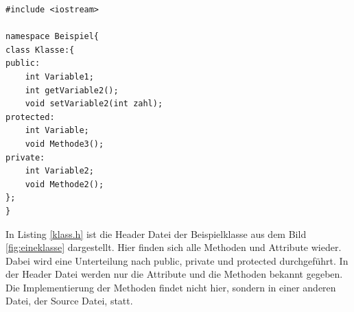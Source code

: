 \begin{lstlisting}[caption = Klasse.h,label=klass.h]
#include <iostream>

namespace Beispiel{
class Klasse:{
public:
	int Variable1;
	int getVariable2();
	void setVariable2(int zahl);
protected:
	int Variable;
	void Methode3();
private:
	int Variable2;
	void Methode2();
};
}
\end{lstlisting}
In Listing \ref{klass.h} ist die Header Datei der Beispielklasse aus dem Bild \ref{fig:eineklasse} dargestellt. Hier finden sich alle Methoden und Attribute  wieder. Dabei wird eine Unterteilung nach \glqq public\grqq{},  \glqq private\grqq{} und \glqq protected\grqq{} durchgeführt. In der Header Datei werden nur die Attribute und die Methoden bekannt gegeben. Die Implementierung der Methoden findet nicht hier, sondern in einer anderen Datei, der Source Datei, statt.  

